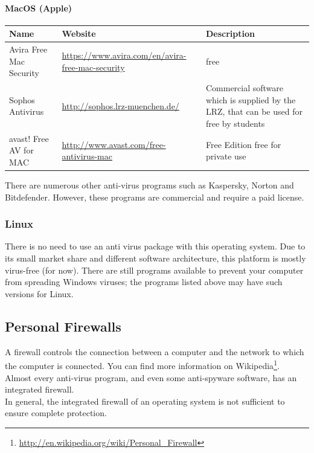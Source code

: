 \documentclass[a4paper,12pt]{scrartcl}
\begin{document}
\paragraph*{MacOS (Apple)}
\begin{center}
  \begin{tabularx}{\linewidth}{|p{.2\linewidth}XX|}
    \hline
    Name & Website & Description\\
    \hline \hline
    Avira Free Mac Security & \url{https://www.avira.com/en/avira-free-mac-security} & free\\
    \hline
    Sophos Antivirus & \url{http://sophos.lrz-muenchen.de/} & Commercial software which is supplied by the LRZ, that can be used for free by students\\
    \hline
    avast! Free AV for MAC & \url{http://www.avast.com/free-antivirus-mac} & Free Edition free for private use\\
    \hline
  \end{tabularx}
\end{center}
There are numerous other anti-virus programs such as Kaspersky, Norton and Bitdefender. However, these programs are commercial and require a paid license.

\subsubsection*{Linux}

There is no need to use an anti virus package with this operating system. Due to its small market share and different software architecture, this platform is mostly virus-free (for now). There are still programs available to prevent your computer from spreading Windows viruses; the programs listed above may have such versions for Linux.

\subsection*{Personal Firewalls}

A firewall controls the connection between a computer and the network to which the computer is connected. You can find more information on Wikipedia\footnote{\url{http://en.wikipedia.org/wiki/Personal\_Firewall}}.
\\
Almost every anti-virus program, and even some anti-spyware software, has an integrated firewall.
\\
In general, the integrated firewall of an operating system is not sufficient to ensure complete protection.
\end{document}
